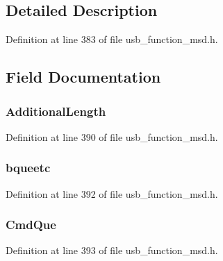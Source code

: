 \subsection{Detailed Description}


Definition at line 383 of file usb\+\_\+function\+\_\+msd.\+h.



\subsection{Field Documentation}
\hypertarget{struct_inquiry_response_a222eee42a3424cfb77f3830b55595cb6}{}
\subsubsection[{Additional\+Length}]{ Additional\+Length}\label{struct_inquiry_response_a222eee42a3424cfb77f3830b55595cb6}


Definition at line 390 of file usb\+\_\+function\+\_\+msd.\+h.

\hypertarget{struct_inquiry_response_aa1796c00e058115e16fe277f60f7fd1b}{}
\subsubsection[{bqueetc}]{ bqueetc}\label{struct_inquiry_response_aa1796c00e058115e16fe277f60f7fd1b}


Definition at line 392 of file usb\+\_\+function\+\_\+msd.\+h.

\hypertarget{struct_inquiry_response_afcb512a84035dc56c56bbc42041fed98}{}
\subsubsection[{Cmd\+Que}]{ Cmd\+Que}\label{struct_inquiry_response_afcb512a84035dc56c56bbc42041fed98}


Definition at line 393 of file usb\+\_\+function\+\_\+msd.\+h.

